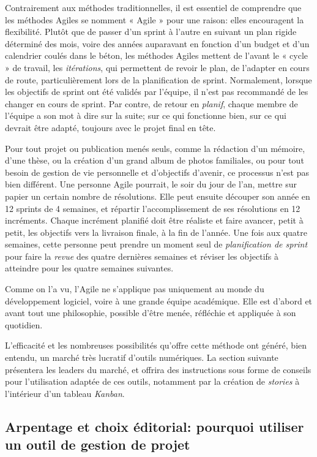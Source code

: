 \documentclass[
  letterpaper,
  DIV=11,
  numbers=noendperiod]{scrreprt}
\begin{document}
Contrairement aux méthodes traditionnelles, il est essentiel de
comprendre que les méthodes Agiles se nomment « Agile » pour une raison:
elles encouragent la flexibilité. Plutôt que de passer d'un sprint à
l'autre en suivant un plan rigide déterminé des mois, voire des années
auparavant en fonction d'un budget et d'un calendrier coulés dans le
béton, les méthodes Agiles mettent de l'avant le « cycle » de travail,
les \emph{itérations}, qui permettent de revoir le plan, de l'adapter en
cours de route, particulièrement lors de la planification de sprint.
Normalement, lorsque les objectifs de sprint ont été validés par
l'équipe, il n'est pas recommandé de les changer en cours de sprint. Par
contre, de retour en \emph{planif}, chaque membre de l'équipe a son mot
à dire sur la suite; sur ce qui fonctionne bien, sur ce qui devrait être
adapté, toujours avec le projet final en tête.

Pour tout projet ou publication menés seuls, comme la rédaction d'un
mémoire, d'une thèse, ou la création d'un grand album de photos
familiales, ou pour tout besoin de gestion de vie personnelle et
d'objectifs d'avenir, ce processus n'est pas bien différent. Une
personne Agile pourrait, le soir du jour de l'an, mettre sur papier un
certain nombre de résolutions. Elle peut ensuite découper son année en
12 sprints de 4 semaines, et répartir l'accomplissement de ses
résolutions en 12 incréments. Chaque incrément planifié doit être
réaliste et faire avancer, petit à petit, les objectifs vers la
livraison finale, à la fin de l'année. Une fois aux quatre semaines,
cette personne peut prendre un moment seul de \emph{planification de
sprint} pour faire la \emph{revue} des quatre dernières semaines et
réviser les objectifs à atteindre pour les quatre semaines suivantes.

Comme on l'a vu, l'Agile ne s'applique pas uniquement au monde du
développement logiciel, voire à une grande équipe académique. Elle est
d'abord et avant tout une philosophie, possible d'être menée, réfléchie
et appliquée à son quotidien.

L'efficacité et les nombreuses possibilités qu'offre cette méthode ont
généré, bien entendu, un marché très lucratif d'outils numériques. La
section suivante présentera les leaders du marché, et offrira des
instructions sous forme de conseils pour l'utilisation adaptée de ces
outils, notamment par la création de \emph{stories} à l'intérieur d'un
tableau \emph{Kanban}.

\subsection{Arpentage et choix éditorial: pourquoi utiliser un outil de
gestion de
projet}\label{arpentage-et-choix-uxe9ditorial-pourquoi-utiliser-un-outil-de-gestion-de-projet}
\end{document}
